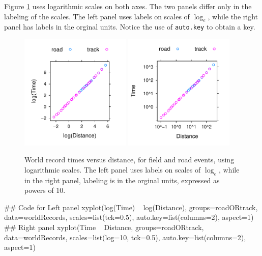 \documentclass{tufte-book}\usepackage[]{graphicx}\usepackage[]{color}
\newcommand{\txtt}[1]{\texttt{#1}}
\begin{document}
Figure \ref{fig:wrlog} uses logarithmic scales on both axes.  The two
panels differ only in the labeling of the scales.  The left panel uses
labels on scales of $\log_e$, while the right panel has labels in the
orginal units.  Notice the use of
\txtt{auto.key} to obtain a key.

\begin{figure}
\begin{Schunk}


\centerline{\includegraphics[width=0.47\textwidth]{figs/05-wrTimesAB-1} \includegraphics[width=0.47\textwidth]{figs/05-wrTimesAB-2} }

\end{Schunk}
\caption{World record times versus distance, for field and road
  events, using logarithmic scales.  The left panel uses labels on
  scales of $\log_e$, while in the right panel, labeling is in the
  orginal units, expressed as powers of 10.}
\label{fig:wrlog}
\end{figure}

\begin{Schunk}
\begin{Sinput}
## Code for Left panel
xyplot(log(Time) ~ log(Distance),
       groups=roadORtrack, data=worldRecords,
       scales=list(tck=0.5),
       auto.key=list(columns=2), aspect=1)
## Right panel
xyplot(Time ~ Distance, groups=roadORtrack,
       data=worldRecords,
       scales=list(log=10, tck=0.5),
       auto.key=list(columns=2), aspect=1)
\end{Sinput}
\end{Schunk}
\vspace*{-9pt}
\end{document}
